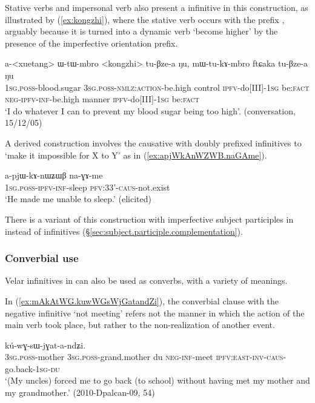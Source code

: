 Stative verbs and impersonal verb also present a  infinitive in this construction, as illustrated by (\ref{ex:kongzhi}), where the stative verb  occurs with the prefix , arguably because it is turned into a dynamic verb `become higher' by the presence of the imperfective orientation prefix.

 \begin{exe}
\ex \label{ex:kongzhi}
\gll  a-<xuetang> ɯ-tɯ-mbro <kongzhi> tu-βze-a ŋu, mɯ-tu-kɤ-mbro ftɕaka tu-βze-a ŋu \\
\textsc{1sg.poss}-blood.sugar \textsc{3sg.poss-nmlz:action}-be.high control \textsc{ipfv}-do[III]-\textsc{1sg} be:\textsc{fact} \textsc{neg-ipfv-inf}-be.high manner \textsc{ipfv}-do[III]-\textsc{1sg} be:\textsc{fact} \\
\glt `I do whatever I can to prevent my blood sugar being too high'. (conversation, 15/12/05)
\end{exe}

A derived construction involves the causative  with doubly prefixed infinitives to `make it impossible for X to Y' as in (\ref{ex:apjWkAnWZWB.naGAme}).

\begin{exe}
\ex \label{ex:apjWkAnWZWB.naGAme}
\gll a-pjɯ-kɤ-nɯʑɯβ na-ɣɤ-me \\
\textsc{1sg}.\textsc{poss}-\textsc{ipfv}-\textsc{inf}-sleep \textsc{pfv}:3\fl{}3'-\textsc{caus}-not.exist \\
\glt `He made me unable to sleep.' (elicited)
\end{exe}

There is a variant of this construction with imperfective subject participles in  instead of infinitives (§\ref{sec:subject.participle.complementation}).
 

\subsubsection{Converbial use}    \label{sec:inf.converb}
Velar infinitives in  can also be used as converbs, with a variety of meanings.


In (\ref{ex:mAkAtWG.kuwWGsWjGatandZi}), the converbial clause with the negative infinitive  `not meeting' refers not the manner in which the action of the main verb took place, but rather to the non-realization of another event. 

\begin{exe}
\ex \label{ex:mAkAtWG.kuwWGsWjGatandZi}
\gll [a-mu a-wi ni mɤ-kɤ-ɤtɯɣ] kú-wɣ-sɯ-jɣat-a-ndʑi. \\
\textsc{3sg}.\textsc{poss}-mother \textsc{3sg}.\textsc{poss}-grand.mother  du \textsc{neg}-\textsc{inf}-meet \textsc{ipfv}:\textsc{east}-\textsc{inv}-\textsc{caus}-go.back-\textsc{1sg}-\textsc{du} \\
\glt `(My uncles) forced me to go back (to school) without having met my mother and my grandmother.' (2010-Dpalcan-09, 54)
\end{exe}

